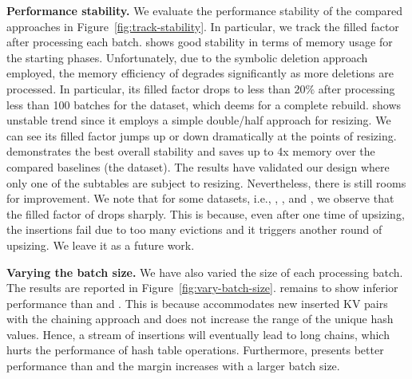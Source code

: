 

\vspace{1mm}\noindent\textbf{Performance stability.}
We evaluate the performance stability of the compared approaches in Figure~\ref{fig:track-stability}. 
In particular, we track the filled factor after processing each batch.
\slab shows good stability in terms of memory usage for the starting phases. Unfortunately, due to the symbolic deletion approach employed, the memory efficiency of \slab degrades significantly as more deletions are processed. In particular, its filled factor drops to less than $20\%$ after processing less than 100 batches for the \dsali dataset, which deems for a complete rebuild.
%
\megakv shows unstable trend since it employs a simple double/half approach for resizing. We can see its filled factor jumps up or down dramatically at the points of resizing. \voter demonstrates the best overall stability and saves up to 4x memory over the compared baselines (the \dsali dataset). 
The results have validated our design where only one of the subtables are subject to resizing. 
Nevertheless, there is still rooms for improvement. We note that for some datasets, i.e., \dstwitter, \dsreddit, \dstpch and \dsrandom, we observe that the filled factor of \voter drops sharply.
This is because, even after one time of upsizing, the insertions fail due to too many evictions and it triggers another round of upsizing. We leave it as a future work. 


\vspace{1mm}\noindent\textbf{Varying the batch size.}
We have also varied the size of each processing batch. The results are reported in Figure~\ref{fig:vary-batch-size}. 
\slab remains to show inferior performance than \megakv and \voter. 
This is because \slab accommodates new inserted KV pairs with the chaining approach and does not increase the range of the unique hash values. Hence, a stream of insertions will eventually lead to long chains, which hurts the performance of hash table operations. Furthermore, \voter presents better performance than \megakv and the margin increases with a larger batch size.


